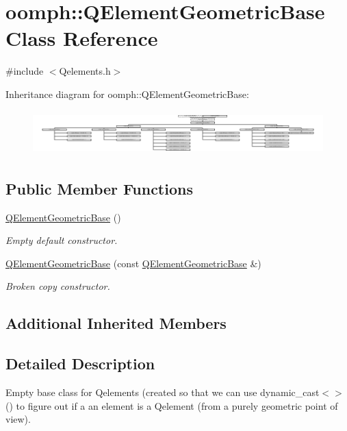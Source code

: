 \hypertarget{classoomph_1_1QElementGeometricBase}{}\section{oomph\+:\+:Q\+Element\+Geometric\+Base Class Reference}
\label{classoomph_1_1QElementGeometricBase}


{\ttfamily \#include $<$Qelements.\+h$>$}

Inheritance diagram for oomph\+:\+:Q\+Element\+Geometric\+Base\+:\begin{figure}[H]
\begin{center}
\leavevmode
\includegraphics[height=1.728395cm]{classoomph_1_1QElementGeometricBase}
\end{center}
\end{figure}
\subsection*{Public Member Functions}
\begin{DoxyCompactItemize}
\item 
\hyperlink{classoomph_1_1QElementGeometricBase_a6529cdebc393658b8b944edc90fdd6bb}{Q\+Element\+Geometric\+Base} ()
\begin{DoxyCompactList}\small\item\em Empty default constructor. \end{DoxyCompactList}\item 
\hyperlink{classoomph_1_1QElementGeometricBase_aca21b8a6b9ad6b760d426643250a5a1a}{Q\+Element\+Geometric\+Base} (const \hyperlink{classoomph_1_1QElementGeometricBase}{Q\+Element\+Geometric\+Base} \&)
\begin{DoxyCompactList}\small\item\em Broken copy constructor. \end{DoxyCompactList}\end{DoxyCompactItemize}
\subsection*{Additional Inherited Members}


\subsection{Detailed Description}
Empty base class for Qelements (created so that we can use dynamic\+\_\+cast$<$$>$() to figure out if a an element is a Qelement (from a purely geometric point of view). 


